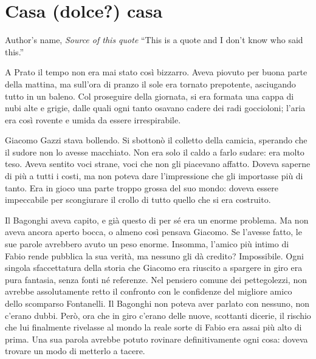 \chapter{Casa (dolce?) casa}

\begin{chapquote}{Author's name, \textit{Source of this quote}}
``This is a quote and I don't know who said this.''
\end{chapquote}



A Prato il tempo non era mai stato così bizzarro. Aveva piovuto per buona parte della mattina, ma sull'ora di pranzo il sole era tornato prepotente, asciugando tutto in un baleno. Col proseguire della giornata, si era formata una cappa di nubi alte e grigie, dalle quali ogni tanto osavano cadere dei radi goccioloni; l'aria era così rovente e umida da essere irrespirabile.

Giacomo Gazzi stava bollendo. Si sbottonò il colletto della camicia, sperando che il sudore non lo avesse macchiato. Non era solo il caldo a farlo sudare: era molto teso. Aveva sentito voci strane, voci che non gli piacevano affatto. Doveva saperne di più a tutti i costi, ma non poteva dare l'impressione che gli importasse più di tanto. Era in gioco una parte troppo grossa del suo mondo: doveva essere impeccabile per scongiurare il crollo di tutto quello che si era costruito.

Il Bagonghi aveva capito, e già questo di per sé era un enorme problema. Ma non aveva ancora aperto bocca, o almeno così pensava Giacomo. Se l'avesse fatto, le sue parole avrebbero avuto un peso enorme. Insomma, l'amico più intimo di Fabio rende pubblica la sua verità, ma nessuno gli dà credito? Impossibile. Ogni singola sfaccettatura della storia che Giacomo era riuscito a spargere in giro era pura fantasia, senza fonti né referenze. Nel pensiero comune dei pettegolezzi, non avrebbe assolutamente retto il confronto con le confidenze del migliore amico dello scomparso Fontanelli. Il Bagonghi non poteva aver parlato con nessuno, non c'erano dubbi. Però, ora che in giro c'erano delle nuove, scottanti dicerie, il rischio che lui finalmente rivelasse al mondo la reale sorte di Fabio era assai più alto di prima. Una sua parola avrebbe potuto rovinare definitivamente ogni cosa: doveva trovare un modo di metterlo a tacere.

